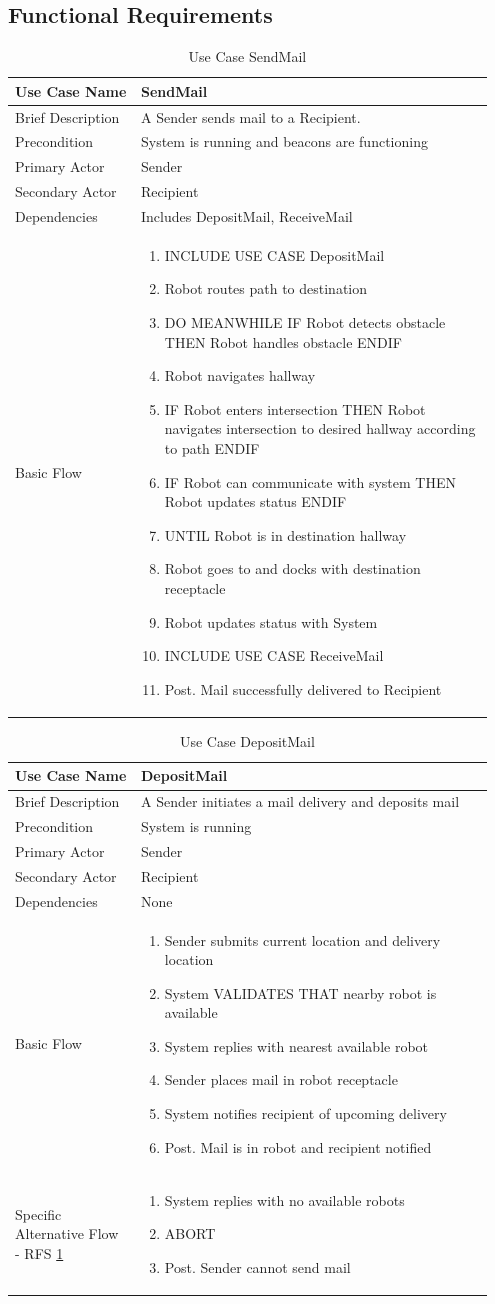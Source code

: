 \documentclass[12pt]{report}
\newcommand\tabularhead[1]{
    \begin{table}[H]
      \caption{Use Case #1}
      \begin{tabular}{|p{0.25\linewidth}|p{0.7\linewidth}|}
        \hline
        \textbf{Use Case Name} & \textbf{#1} \\
        \hline}
\newcommand\addrow[2]{#1 &#2\\ \hline}
\newcommand\addmulrow[2]{ \begin{minipage}[t][][t]{4cm}\raggedright#1\end{minipage} 
         &\begin{minipage}[t][][t]{10cm}
          \begin{enumerate} #2   \end{enumerate}
          \end{minipage} \vspace{0.1cm} \\ \hline}
\newenvironment{usecase}{\tabularhead}
    {\end{tabular}\end{table}}
\begin{document}
\subsection{Functional Requirements}

\begin{usecase}{SendMail}
    \addrow{Brief Description}{A Sender sends mail to a Recipient.}
    \addrow{Precondition}{System is running and beacons are functioning}
    \addrow{Primary Actor}{Sender}
    \addrow{Secondary Actor}{Recipient}
    \addrow{Dependencies}{Includes DepositMail, ReceiveMail}
    \addmulrow{Basic Flow}{
        \item INCLUDE USE CASE DepositMail
        \item Robot routes path to destination
        \item DO MEANWHILE IF Robot detects obstacle THEN Robot handles obstacle ENDIF
        \item Robot navigates hallway
        \item IF Robot enters intersection THEN Robot navigates intersection to desired hallway according to path ENDIF
        \item IF Robot can communicate with system THEN Robot updates status ENDIF
        \item UNTIL Robot is in destination hallway
        \item Robot goes to and docks with destination receptacle
        \item Robot updates status with System
        \item INCLUDE USE CASE ReceiveMail
        \item[Post.] Mail successfully delivered to Recipient
    }
\end{usecase}

\begin{usecase}{DepositMail}
    \addrow{Brief Description}{A Sender initiates a mail delivery and deposits mail}
    \addrow{Precondition}{System is running}
    \addrow{Primary Actor}{Sender}
    \addrow{Secondary Actor}{Recipient}
    \addrow{Dependencies}{None}
    \addmulrow{Basic Flow}{
        \item Sender submits current location and delivery location
        \item System VALIDATES THAT nearby robot is available \label{validatesAvailable}
        \item System replies with nearest available robot
        \item Sender places mail in robot receptacle
        \item System notifies recipient of upcoming delivery
        \item [Post.] Mail is in robot and recipient notified
    }
    \addmulrow{Specific Alternative Flow - RFS \ref{validatesAvailable}}{
        \item System replies with no available robots
        \item ABORT
        \item[Post.] Sender cannot send mail
    }
\end{usecase}
\end{document}
